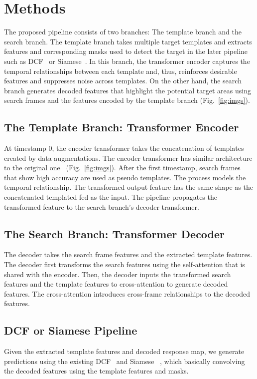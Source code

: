 \documentclass[10pt,twocolumn,letterpaper]{article}
\begin{document}
\section{Methods}
The proposed pipeline consists of two branches: The template branch and the search branch. The template branch takes multiple target templates and extracts features and corresponding masks used to detect the target in the later pipeline such as DCF~\cite{DiMP, ATOM} or Siamese~\cite{SiamFC}. In this branch, the transformer encoder captures the temporal relationships between each template and, thus, reinforces desirable features and suppresses noise across templates. On the other hand, the search branch generates decoded features that highlight the potential target areas using search frames and the features encoded by the template branch (Fig.~\ref{fig:imgs}).

\subsection{The Template Branch: Transformer Encoder}
At timestamp 0, the encoder transformer takes the concatenation of templates created by data augmentations. The encoder transformer has similar architecture to the original one~\cite{SA} (Fig.~\ref{fig:imgs}). After the first timestamp, search frames that show high accuracy are used as pseudo templates. The process models the temporal relationship. The transformed output feature has the same shape as the concatenated templated fed as the input. The pipeline propagates the transformed feature to the search branch's decoder transformer.

\subsection{The Search Branch: Transformer Decoder}
The decoder takes the search frame features and the extracted template features. The decoder first transforms the search features using the self-attention that is shared with the encoder. Then, the decoder inputs the transformed search features and the template features to cross-attention to generate decoded features. The cross-attention introduces cross-frame relationships to the decoded features.

\subsection{DCF or Siamese Pipeline}
Given the extracted template features and decoded response map, we generate predictions using the existing DCF~\cite{DiMP, ATOM} and Siamese ~\cite{SiamFC}, which basically convolving the decoded features using the template features and masks.
\end{document}
